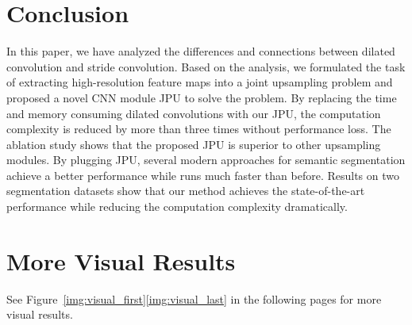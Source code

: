 \documentclass[10pt,twocolumn,letterpaper]{article}
\begin{document}
\section{Conclusion}
In this paper, we have analyzed the differences and connections between dilated convolution and stride convolution.
Based on the analysis, we formulated the task of extracting high-resolution feature maps into a joint upsampling problem and proposed a novel CNN module JPU to solve the problem.
By replacing the time and memory consuming dilated convolutions with our JPU, the computation complexity is reduced by more than three times without performance loss.
The ablation study shows that the proposed JPU is superior to other upsampling modules.
By plugging JPU, several modern approaches for semantic segmentation achieve a better performance while runs much faster than before.
Results on two segmentation datasets show that our method achieves the state-of-the-art performance while reducing the computation complexity dramatically. 


{\small


}

\section*{More Visual Results}
See Figure~\ref{img:visual_first}\ref{img:visual_last} in the following pages for more visual results.
\end{document}
